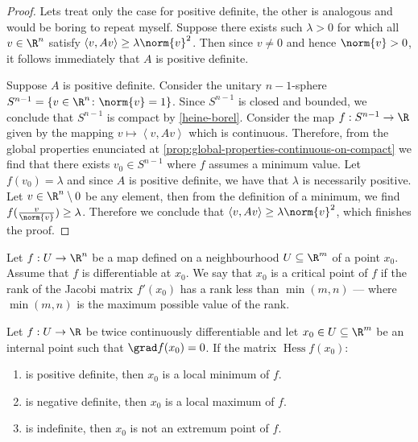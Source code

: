 \begin{proof}
  Lets treat only the case for positive definite, the other is analogous and
  would be boring to repeat myself. Suppose there exists such \(\lambda > 0\) for
  which all \(v \in \R^n\) satisfy \(\left\langle v, Av \right\rangle \geq \lambda \norm{v}^2\). Then
  since \(v \neq 0\) and hence \(\norm{v} > 0\), it follows immediately that \(A\)
  is positive definite.

  Suppose \(A\) is positive definite. Consider the unitary \(n-1\)-sphere
  \(S^{n-1} = \{v \in \R^{n} \colon \norm{v} = 1\}\). Since \(S^{n-1}\) is closed and
  bounded, we conclude that \(S^{n-1}\) is compact by
  \cref{heine-borel}. Consider the map \(f: S^{n-1} \to \R\) given by the mapping
  \(v \mapsto \left\langle v, Av \right\rangle\) which is continuous. Therefore, from the global
  properties enunciated at \cref{prop:global-properties-continuous-on-compact}
  we find that there exists \(v_0 \in S^{n-1}\) where \(f\) assumes a minimum
  value. Let \(f(v_0) = \lambda\) and since \(A\) is positive definite, we have that
  \(\lambda\) is necessarily positive. Let \(v \in \R^n \setminus 0\) be any element, then from
  the definition of a minimum, we find \(f(\frac{v}{\norm{v}}) \geq \lambda\). Therefore
  we conclude that \(\left\langle v, Av \right\rangle \geq \lambda \norm{v}^2\), which finishes the
  proof.
\end{proof}

\begin{definition}
  \label{def:critical-point}
  Let \(f: U \to \R^n\) be a map defined on a neighbourhood \(U \subseteq \R^m\) of a
  point \(x_0\). Assume that \(f\) is differentiable at \(x_0\). We say that
  \(x_0\) is a critical point of \(f\) if the rank of the Jacobi matrix
  \(f'(x_0)\) has a rank less than \(\min(m, n)\) --- where \(\min(m, n)\) is the
  maximum possible value of the rank.
\end{definition}

\begin{theorem}
  \label{thm:classification-critical-points}
  Let \(f: U \to \R\) be twice continuously differentiable and let \(x_0 \in U \subseteq
  \R^m\) be an internal point such that \(\grad f(x_0) = 0\). If
  the matrix \(\operatorname{Hess} f(x_0)\):
  \begin{enumerate}\setlength\itemsep{0em}
    \item is positive definite, then \(x_0\) is a local
      minimum of \(f\).
    \item is negative definite, then \(x_{0}\) is a local
      maximum of \(f\).
    \item is indefinite, then \(x_0\) is not an extremum point of \(f\).
  \end{enumerate}
\end{theorem}

